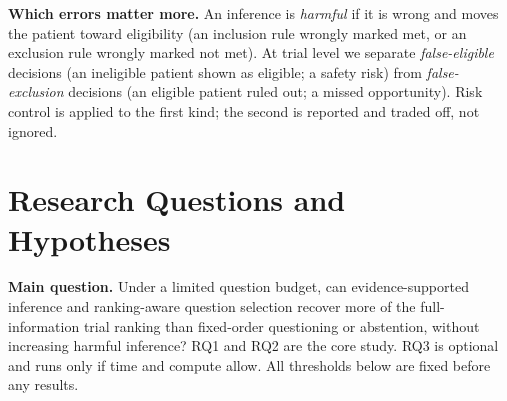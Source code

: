 \documentclass[10pt,a4paper]{article}
\begin{document}
\textbf{Which errors matter more.} An inference is \emph{harmful} if it is wrong and moves the patient toward eligibility (an inclusion rule wrongly marked met, or an exclusion rule wrongly marked not met). At trial level we separate \emph{false-eligible} decisions (an ineligible patient shown as eligible; a safety risk) from \emph{false-exclusion} decisions (an eligible patient ruled out; a missed opportunity). Risk control is applied to the first kind; the second is reported and traded off, not ignored.

\section{Research Questions and Hypotheses}
\textbf{Main question.} Under a limited question budget, can evidence-supported inference and ranking-aware question selection recover more of the full-information trial ranking than fixed-order questioning or abstention, without increasing harmful inference? RQ1 and RQ2 are the core study. RQ3 is optional and runs only if time and compute allow. All thresholds below are fixed before any results.
\end{document}
